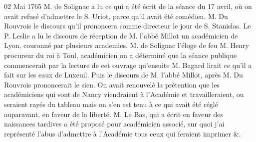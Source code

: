 \begin{diary}{02 Mai 1765}{}
                           M. de Solignac a lu ce qui a été
                           écrit
                           de la séance du 17 avril, où on
                           avait
                           refusé d'admettre le S. Uriot,
                           parce qu'il
                           avait été comédien. M. Du
                              Rouvrois le
                           discours qu'il prononcera comme directeur
                           le jour de S. Stanislas. Le P.
                              Leslie a lu
                           le discours de réception de M. l'abbé Millot
                           un académicien de Lyon,
                           couronné par plusieurs
                           academies. M. de Solignac
                           l'éloge de feu
                           M. Henry
                           procureur du roi à Toul,
                           académicien
                           on a déterminé que la séance publique
                           commencerait par la lecture de cet ouvrage qu'ensuite M.
                              Bagard lirait ce qu'il a fait
                           sur les eaux de Luxeuil. Puis le discours
                              de M. l'abbé
                                 Millot, après M. Du
                              Rouvrois
                           prononcerait le sien. On
                           avait renouvelé
                           la prétention que les académiciens qui sont
                           de Nancy viendraient à
                              l'Académie et
                           travailleraient, ou seraient rayés du tableau
                           mais on s'en est tenu à ce qui avait été
                           réglé auparavant, en faveur de la liberté.
                           M. Le Bas, qui a écrit en faveur
                           des
                           naissances tardives a été proposé pour
                           académicien associé, sur quoi j'ai représenté
                           l'abus d'admettre à l'Académie
                           tous ceux qui
                           feraient imprimer \&. \bigskip


                     \end{diary}


